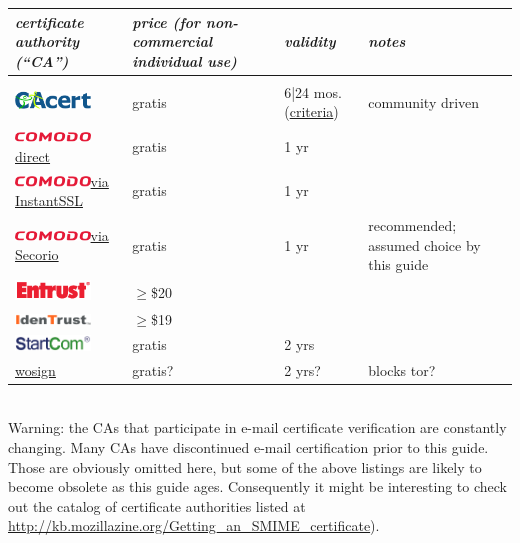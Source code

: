 \documentclass[pdftex,12pt,titlepage=false]{scrartcl}
\newcommand{\secorio}{\href{https://www.secorio.com/}{\includegraphics[width=2cm]{images/logo_comodo.png}\tiny via Secorio}}
\begin{document}
\begin{tabular}{lp{2.3cm}l>{\tiny}l}
  \sl certificate authority (``CA'')& \sl price \newline\tiny(for non-commercial individual use) & \sl validity & \sl\normalsize notes\\
  \hline\\
  \href{https://www.cacert.org/}{\includegraphics[width=2cm]{images/logo_cacert4.png}} & gratis & 6|24 mos.\tiny (\href{http://wiki.cacert.org/FAQ/Privileges}{criteria}) & community driven\\
  \href{https://secure.comodo.com/products/frontpage?area=SecureEmailCertificate}{\includegraphics[width=2cm]{images/logo_comodo.png}\tiny direct} & gratis & 1 yr &\\
  \href{https://www.instantssl.com/ssl-certificate-products/free-email-certificate.html}{\includegraphics[width=2cm]{images/logo_comodo.png}\tiny via InstantSSL} & gratis & 1 yr &\\
  \secorio & gratis & 1 yr & recommended; assumed choice by this guide\\
  \href{https://www.entrust.com/secure-email-certificates/}{\includegraphics[width=2cm]{images/logo_entrust.png}} & $\geq$\$20 & \\
  \href{https://www.identrust.com/certificates/trustid.html}{\includegraphics[width=2cm]{images/logo_trustid.png}} & $\geq$\$19 & \\
  \href{https://www.startcomca.com/}{\includegraphics[width=2cm]{images/logo_startcom.png}} & gratis & 2 yrs & \\
  \href{https://buy.wosign.com/free/}{wosign} & gratis? & 2 yrs? & blocks tor?\\
\end{tabular}\\

{\tiny Warning: the CAs that participate in e-mail certificate
  verification are constantly changing.  Many CAs have discontinued
  e-mail certification prior to this guide.  Those are obviously
  omitted here, but some of the above listings are likely to become
  obsolete as this guide ages.  Consequently it might be interesting
  to check out the catalog of certificate authorities listed at
  \url{http://kb.mozillazine.org/Getting_an_SMIME_certificate}).}
\end{document}
